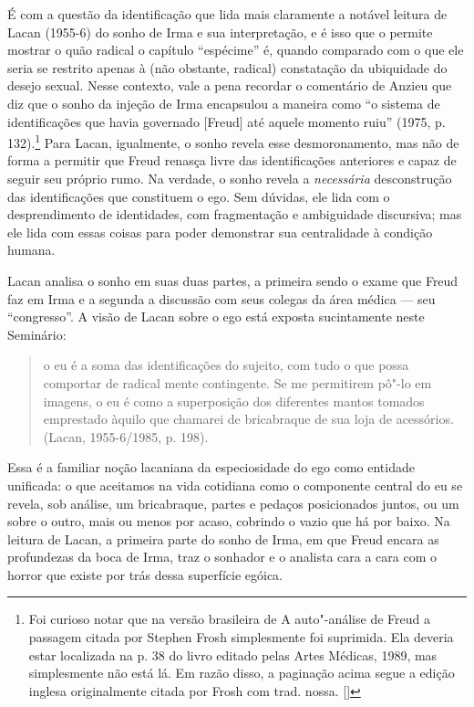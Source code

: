 É com a questão da identificação que lida mais claramente a notável
leitura de Lacan (1955-6) do sonho de Irma e sua interpretação, e é isso
que o permite mostrar o quão radical o capítulo ``espécime'' é, quando
comparado com o que ele seria se restrito apenas à (não obstante,
radical) constatação da ubiquidade do desejo sexual. Nesse contexto,
vale a pena recordar o comentário de Anzieu que diz que o sonho da
injeção de Irma encapsulou a maneira como ``o sistema de identificações
que havia governado {[}Freud{]} até aquele momento ruiu'' (1975, p.
132).\footnote{Foi curioso notar que na versão brasileira de A
  auto"-análise de Freud a passagem citada por Stephen Frosh simplesmente
  foi suprimida. Ela deveria estar localizada na p. 38 do livro editado
  pelas Artes Médicas, 1989, mas simplesmente não está lá. Em razão
  disso, a paginação acima segue a edição inglesa originalmente citada
  por Frosh com trad. nossa. []} Para Lacan, igualmente, o sonho
revela esse desmoronamento, mas não de forma a permitir que Freud
renasça livre das identificações anteriores e capaz de seguir seu
próprio rumo. Na verdade, o sonho revela a \emph{necessária}
desconstrução das identificações que constituem o ego. Sem dúvidas, ele
lida com o desprendimento de identidades, com fragmentação e ambiguidade
discursiva; mas ele lida com essas coisas para poder demonstrar sua
centralidade à condição humana.

Lacan analisa o sonho em suas duas partes, a primeira sendo o exame que
Freud faz em Irma e a segunda a discussão com seus colegas da área
médica --- seu ``congresso''. A visão de Lacan sobre o ego está exposta
sucintamente neste Seminário:

\begin{quote}
o eu é a soma das identificações do sujeito, com tudo o que possa
comportar de radical mente contingente. Se me permitirem pô"-lo em
imagens, o eu é como a superposição dos diferentes mantos tomados
emprestado àquilo que chamarei de bricabraque de sua loja de acessórios.
(Lacan, 1955-6/1985, p. 198).
\end{quote}

Essa é a familiar noção lacaniana da especiosidade do ego como entidade
unificada: o que aceitamos na vida cotidiana como o componente central
do eu se revela, sob análise, um bricabraque, partes e pedaços
posicionados juntos, ou um sobre o outro, mais ou menos por acaso,
cobrindo o vazio que há por baixo. Na leitura de Lacan, a primeira parte
do sonho de Irma, em que Freud encara as profundezas da boca de Irma,
traz o sonhador e o analista cara a cara com o horror que existe por
trás dessa superfície egóica.

